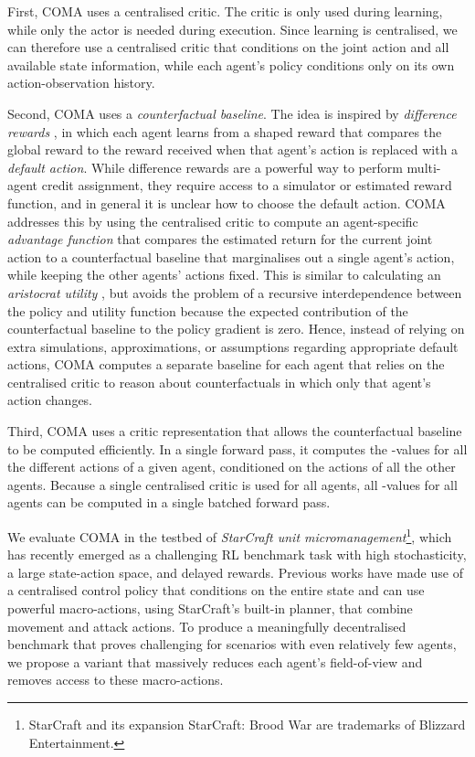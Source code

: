 \documentclass[letterpaper]{article}
\newcommand{\citep}{\cite}
\begin{document}
First, COMA uses a centralised critic. The critic is only used during learning, 
while only the actor is needed during execution. Since learning is centralised, 
we can therefore use a centralised critic that conditions on the joint action 
and all available state information, while each agent's policy conditions only 
on its own action-observation history.

Second, COMA uses a \emph{counterfactual baseline}.  The idea is inspired by 
\emph{difference rewards} \citep{wolpert2002optimal,tumer2007distributed}, in 
which each agent 
learns from a shaped reward that compares the global reward to the reward 
received when that agent's action is replaced with a \emph{default action}.  
While difference rewards are a powerful way to perform multi-agent credit 
assignment, they require access to a simulator or estimated reward 
function, and in general it is unclear how to choose the default 
action. COMA addresses this by using the centralised critic to compute an agent-specific
\emph{advantage function} that compares the estimated return for the 
current joint action  to a counterfactual baseline that marginalises out a 
single 
agent's action, while keeping the other agents' actions fixed. This is similar 
to calculating an \emph{aristocrat utility} \citep{wolpert2002optimal}, but 
avoids the problem of a recursive interdependence between the policy and utility function 
because the expected contribution of the counterfactual baseline to 
the policy gradient is zero.
Hence, instead of relying on extra simulations, approximations, or assumptions 
regarding appropriate default actions, COMA computes a separate 
baseline for each agent that relies on the centralised critic to reason about
counterfactuals in which only that agent's action changes.

Third, COMA uses a critic representation that allows the counterfactual baseline to be computed efficiently.  In a single forward pass, it computes the -values for all the different actions of a given agent, conditioned on the actions of all the other agents.   Because a single centralised critic is used for all agents, all -values for all agents can be computed in a single batched forward pass.

We evaluate COMA in the testbed of \emph{StarCraft unit 
micromanagement}\footnote{StarCraft and its expansion StarCraft: Brood War are 
trademarks of Blizzard Entertainment\texttrademark.}, which has recently 
emerged as a challenging RL benchmark task with high stochasticity, a large 
state-action space, and delayed rewards. Previous works  
\citep{usunier2016episodic,peng2017multiagent} have made use of a centralised 
control policy that conditions on the entire state and can use powerful 
macro-actions, using StarCraft's built-in planner, that combine movement and 
attack actions. To produce a meaningfully decentralised benchmark that proves 
challenging for scenarios with even relatively few agents, we propose a variant 
that massively reduces each agent's field-of-view and removes access to these 
macro-actions.
\end{document}
